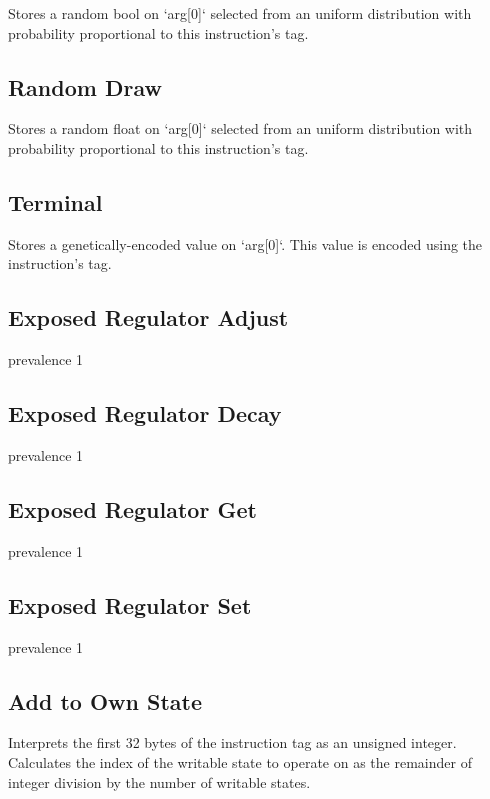 
Stores a random bool on `arg[0]` selected from an uniform distribution with probability proportional to this instruction's tag.

\subsection{Random Draw}


Stores a random float on `arg[0]` selected from an uniform distribution with probability proportional to this instruction's tag.

\subsection{Terminal}


Stores a genetically-encoded value on `arg[0]`. This value is encoded using the instruction's tag.

\subsection{Exposed Regulator Adjust}

prevalence 1

\subsection{Exposed Regulator Decay}

prevalence 1

\subsection{Exposed Regulator Get}

prevalence 1

\subsection{Exposed Regulator Set}

prevalence 1


\subsection{Add to Own State}


Interprets the first 32 bytes of the instruction tag as an unsigned integer.
Calculates the index of the writable state to operate on as the remainder of integer division by the number of writable states.

